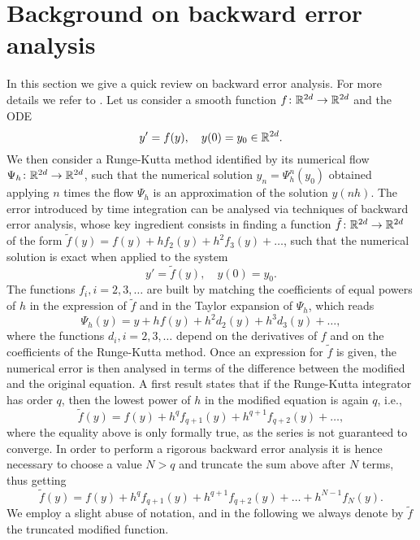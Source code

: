 \documentclass[10pt]{article}
\begin{document}
\section{Background on backward error analysis}\label{sec:BEA} In this section we give a quick review on backward error analysis. For more details we refer to \cite{HLW06, LeR04, SaC94}. Let us consider a smooth function $f \colon \mathbb{R}^{2d} \to \mathbb{R}^{2d}$ and the ODE
\begin{equation}
	y' = f(y), \quad y(0) = y_0 \in \mathbb{R}^{2d}.
\end{equation}
We then consider a Runge-Kutta method identified by its numerical flow $\Psi_h \colon \mathbb{R}^{2d} \to \mathbb{R}^{2d}$, such that the numerical solution $y_n = \Psi_h^n(y_0)$ obtained applying $n$ times the flow $\Psi_h$ is an approximation of the solution $y(nh)$. The error introduced by time integration can be analysed via techniques of backward error analysis, whose key ingredient consists in finding a function $\tilde f\colon \mathbb{R}^{2d} \to \mathbb{R}^{2d}$ of the form $\tilde f(y) = f(y) + hf_2(y) + h^2 f_3(y) + \ldots$, such that the numerical solution is exact when applied to the system 
\begin{equation}
	y' = \tilde f(y), \quad y(0) = y_0.
\end{equation}
The functions $f_i, i = 2, 3, \ldots$ are built by matching the coefficients of equal powers of $h$ in the expression of $\tilde f$ and in the Taylor expansion of $\Psi_h$, which reads
\begin{equation}
	\Psi_h(y) = y + h f(y) + h^2 d_2(y) + h^3 d_3(y) + \ldots,  
\end{equation}
where the functions $d_i, i = 2, 3, \ldots$ depend on the derivatives of $f$ and on the coefficients of the Runge-Kutta method. Once an expression for $\tilde f$ is given, the numerical error is then analysed in terms of the difference between the modified and the original equation. A first result states that if the Runge-Kutta integrator has order $q$, then the lowest power of $h$ in the modified equation is again $q$, i.e.,
\begin{equation}
	\tilde f(y) = f(y) + h^q f_{q+1}(y) + h^{q+1} f_{q+2}(y) + \ldots,
\end{equation}
where the equality above is only formally true, as the series is not guaranteed to converge. In order to perform a rigorous backward error analysis it is hence necessary to choose a value $N > q$ and truncate the sum above after $N$ terms, thus getting
\begin{equation}
	\tilde f(y) = f(y) + h^q f_{q+1}(y) + h^{q+1} f_{q+2}(y) + \ldots + h^{N-1}f_N(y).
\end{equation}
We employ a slight abuse of notation, and in the following we always denote by $\tilde f$ the truncated modified function. 
\end{document}
